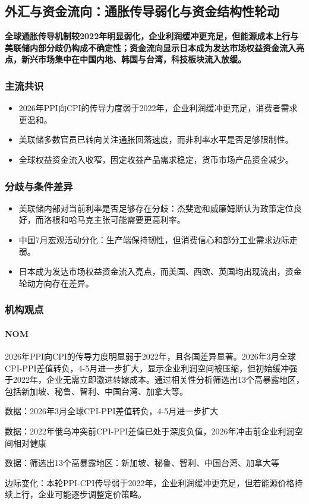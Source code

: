 \documentclass[11pt]{ctexart}
\begin{document}
\subsection{外汇与资金流向：通胀传导弱化与资金结构性轮动}
\textbf{全球通胀传导机制较2022年明显弱化，企业利润缓冲更充足，但能源成本上行与美联储内部分歧仍构成不确定性；资金流向显示日本成为发达市场权益资金流入亮点，新兴市场集中在中国内地、韩国与台湾，科技板块流入放缓。}
\subsubsection*{主流共识}
\begin{itemize}
  \item 2026年PPI向CPI的传导力度弱于2022年，企业利润缓冲更充足，消费者需求更温和。
  \item 美联储多数官员已转向关注通胀回落速度，而非利率水平是否足够限制性。
  \item 全球权益资金流入收窄，固定收益产品需求稳定，货币市场产品资金减少。
\end{itemize}
\subsubsection*{分歧与条件差异}
\begin{itemize}
  \item 美联储内部对当前利率是否足够存在分歧：杰斐逊和威廉姆斯认为政策定位良好，而洛根和哈马克主张可能需要更高利率。
  \item 中国7月宏观活动分化：生产端保持韧性，但消费信心和部分工业需求边际走弱。
  \item 日本成为发达市场权益资金流入亮点，而美国、西欧、英国均出现流出，资金轮动方向存在差异。
\end{itemize}
\subsubsection*{机构观点}
\paragraph{NOM} 2026年PPI向CPI的传导力度明显弱于2022年，且各国差异显著。2026年3月全球CPI-PPI差值转负，4-5月进一步扩大，显示企业利润空间被压缩，但初始缓冲强于2022年，企业无需立即激进转嫁成本。通过相关性分析筛选出13个高暴露地区，包括新加坡、秘鲁、智利、中国台湾、加拿大等。
{\small\color{refgray}数据：2026年3月全球CPI-PPI差值转负，4-5月进一步扩大\par}
{\small\color{refgray}数据：2022年俄乌冲突前CPI-PPI差值已处于深度负值，2026年冲击前企业利润空间相对健康\par}
{\small\color{refgray}数据：筛选出13个高暴露地区：新加坡、秘鲁、智利、中国台湾、加拿大等\par}
{\small\color{refgray}边际变化：本轮PPI-CPI传导弱于2022年，企业利润缓冲更充足，但若能源价格持续上行，企业可能逐步调整定价策略。\par}
\end{document}
